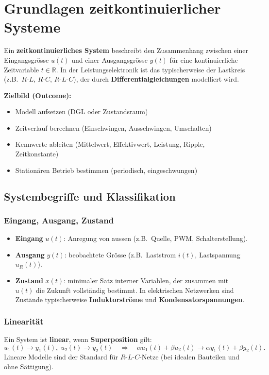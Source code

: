 \section{Grundlagen zeitkontinuierlicher Systeme}

Ein \textbf{zeitkontinuierliches System} beschreibt den Zusammenhang zwischen einer Eingangsgrösse $u(t)$ und einer Ausgangsgrösse $y(t)$
für eine kontinuierliche Zeitvariable $t \in \mathbb{R}$.
In der Leistungselektronik ist das typischerweise der Lastkreis (z.B.\ $R$-$L$, $R$-$C$, $R$-$L$-$C$), der durch \textbf{Differentialgleichungen}
modelliert wird.

\smallskip

\textbf{Zielbild (Outcome):}
\begin{itemize}
    \item Modell aufsetzen (DGL oder Zustandsraum)
    \item Zeitverlauf berechnen (Einschwingen, Ausschwingen, Umschalten)
    \item Kennwerte ableiten (Mittelwert, Effektivwert, Leistung, Ripple, Zeitkonstante)
    \item Stationären Betrieb bestimmen (periodisch, eingeschwungen)
\end{itemize}

\subsection{Systembegriffe und Klassifikation}

\subsubsection{Eingang, Ausgang, Zustand}
\begin{itemize}
    \item \textbf{Eingang} $u(t)$: Anregung von aussen (z.B.\ Quelle, PWM, Schalterstellung).
    \item \textbf{Ausgang} $y(t)$: beobachtete Grösse (z.B.\ Laststrom $i(t)$, Lastspannung $u_R(t)$).
    \item \textbf{Zustand} $x(t)$: minimaler Satz interner Variablen, der zusammen mit $u(t)$ die Zukunft vollständig bestimmt.
          In elektrischen Netzwerken sind Zustände typischerweise \textbf{Induktorströme} und \textbf{Kondensatorspannungen}.
\end{itemize}

\subsubsection{Linearität}
Ein System ist \textbf{linear}, wenn \textbf{Superposition} gilt:
\[
u_1(t)\rightarrow y_1(t),\; u_2(t)\rightarrow y_2(t)\quad \Rightarrow \quad
\alpha u_1(t)+\beta u_2(t)\rightarrow \alpha y_1(t)+\beta y_2(t).
\]
Lineare Modelle sind der Standard für $R$-$L$-$C$-Netze (bei idealen Bauteilen und ohne Sättigung).

